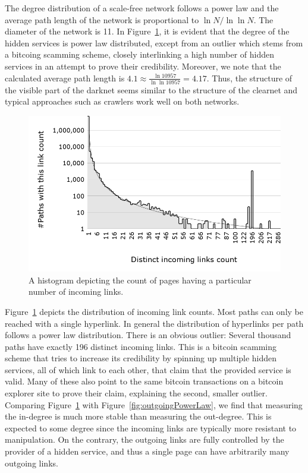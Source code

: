 The degree distribution of a scale-free network follows a power law and the average path length of the network is proportional to $\ln{N}/\ln{\ln{N}}$. The diameter of the  network is 11. In Figure~\ref{fig:powerLawAbnormality}, it is evident that the degree of the hidden services is power law distributed, except from an outlier which stems from a bitcoing scamming scheme, closely interlinking a high number of hidden services in an attempt to prove their credibility. Moreover, we note that the calculated average path length is $4.1 \approx \frac{\ln 10957}{\ln\ln 10957} = 4.17$. 
Thus, the structure of the visible part of the darknet seems similar to the structure of the clearnet and typical approaches such as crawlers work well on both networks.

\begin{figure}[H]
\includegraphics[width=\linewidth]{images/DistinctIncomingLinksCount.png}
\caption{A histogram depicting the count of pages having a particular
             number of incoming links.}
\label{fig:powerLawAbnormality}
\end{figure}

Figure~\ref{fig:powerLawAbnormality} depicts the distribution of incoming link counts. Most paths can only be reached with a single hyperlink. In general the distribution of hyperlinks per path follows a power law distribution. There is an obvious outlier: Several thousand paths have exactly 196 distinct incoming links. This is a bitcoin scamming scheme that tries to increase its credibility by spinning up multiple hidden services, all of which link to each other, that claim that the provided service is valid. Many of these also point to the same bitcoin transactions on a bitcoin explorer site to prove their claim, explaining the second, smaller outlier.
Comparing Figure~\ref{fig:powerLawAbnormality} with Figure~\ref{fig:outgoingPowerLaw}, we find that measuring the in-degree is much more stable than measuring the out-degree. This is expected to some degree since the incoming links are typically more resistant to manipulation. On the contrary, the outgoing links are fully controlled by the provider of a hidden service, and thus a single page can have arbitrarily many outgoing links.

